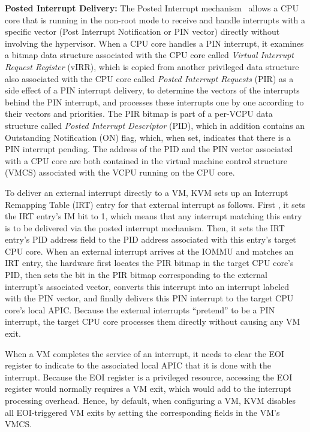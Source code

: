 {\bf Posted Interrupt Delivery:}
The Posted Interrupt mechanism~\cite{intelvtd-paper,intelvtd-manual} allows a CPU core that is running in the non-root mode to receive and handle interrupts with a specific vector
(Post Interrupt Notification or PIN vector) directly without involving the hypervisor.
When a CPU core handles a PIN interrupt, it examines a bitmap data structure associated with the CPU core called {\em Virtual Interrupt Request Register} (vIRR),
which is copied from another privileged data structure also associated with the CPU core called {\em Posted Interrupt Requests} (PIR) as a side effect of a PIN interrupt delivery,
to determine the vectors of the interrupts behind the PIN interrupt, and processes these interrupts one by one according to their vectors and priorities.
The PIR bitmap is part of a per-VCPU data structure called {\em Posted Interrupt Descriptor} (PID), which in addition contains an Outstanding Notification (ON) flag, which, when set, indicates that there is a PIN interrupt pending.
The address of the PID and the PIN vector associated with a CPU core are both contained in the virtual machine control structure (VMCS) associated with the VCPU running on the CPU core.


To deliver an external interrupt directly to a VM, KVM sets up an Interrupt Remapping Table (IRT) entry for that external interrupt as follows.
First , it sets the IRT entry's IM bit to 1, which means that any interrupt matching this entry is to be delivered via the posted interrupt mechanism.
Then, it sets the IRT entry's PID address field to the PID address associated with this entry's target CPU core.
When an external interrupt arrives at the IOMMU and matches an IRT entry, the
hardware first locates the PIR bitmap in the target CPU core's PID, then sets the bit in the PIR bitmap corresponding to the external interrupt's associated vector,
converts this interrupt into an interrupt labeled with the PIN vector, and finally delivers this PIN interrupt to the target CPU core's local APIC.
Because the external interrupts ``pretend'' to be a PIN interrupt, the target CPU core processes them directly without causing any VM exit.

When a VM completes the service of an interrupt, it needs to clear the EOI register to indicate to the
associated local APIC that it is done with the interrupt. Because the EOI register is a privileged resource, accessing the EOI register
would normally requires a VM exit, which would add to the interrupt processing overhead.
Hence, by default, when configuring a VM, KVM disables all EOI-triggered VM exits by setting the corresponding fields in the VM's VMCS.

